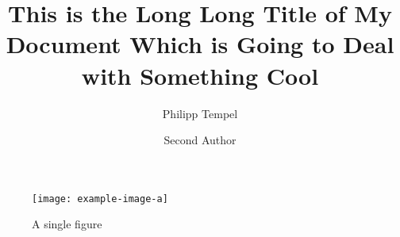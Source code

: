 \documentclass[%
  draft,%
  oneside,%
  ngerman,%
  english,%
]{iswartcl}
\author{Philipp Tempel \and Second Author}
\date{\printdate{2017-10-02}}
\title{This is the Long Long Title of My Document Which is Going to Deal with Something Cool}
\begin{document}
\frontmatter



\maketitle



\begin{abstract}
  \Blindtext[2][1]
\end{abstract}




\tableofcontents

\listoffigures

\listoftables





\mainmatter





\Blinddocument

\begin{figure}
  \centering
  \smaller[1]
  \texttt{[image: example-image-a]}
  \caption{%
    A single figure
  }
  \label{fig:single-figure}
\end{figure}
\end{document}
